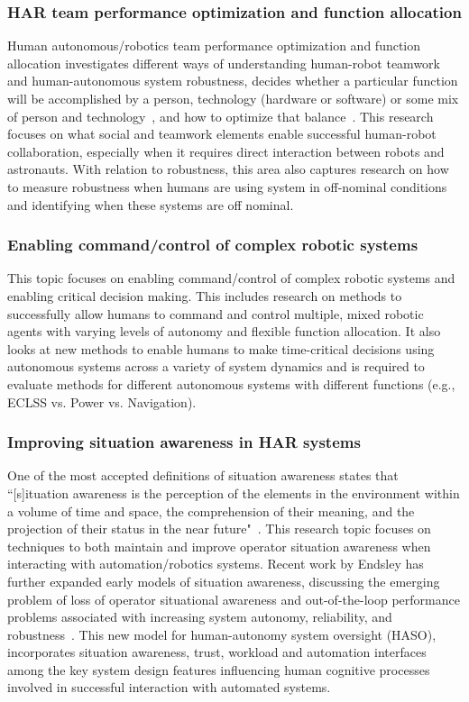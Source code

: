 \subsubsection{HAR team performance optimization and function allocation}
Human autonomous/robotics team performance optimization and function allocation investigates different ways of understanding human-robot teamwork and human-autonomous system robustness, decides whether a particular function will be accomplished by a person, technology (hardware or software) or some mix of person and technology~\citep{fitts_human_1951}, and how to optimize that balance~\citep{yanco_analysis_2015}.
This research focuses on what social and teamwork elements enable successful human-robot collaboration, especially when it requires direct interaction between robots and astronauts.
With relation to robustness, this area also captures research on how to measure robustness when humans are using system in off-nominal conditions and identifying when these systems are off nominal.

\subsubsection{Enabling command/control of complex robotic systems}
This topic focuses on enabling command/control of complex robotic systems and enabling critical decision making.
This includes research on methods to successfully allow humans to command and control multiple, mixed robotic agents with varying levels of autonomy and flexible function allocation.
It also looks at new methods to enable humans to make time-critical decisions using autonomous systems across a variety of system dynamics and is required to evaluate methods for different autonomous systems with different functions (e.g., ECLSS vs. Power vs. Navigation).

\subsubsection{Improving situation awareness in HAR systems}
One of the most accepted definitions of situation awareness states that ``[s]ituation awareness is the perception of the elements in the environment within a volume of time and space, the comprehension of their meaning, and the projection of their status in the near future"~\citep{endsley2017toward}.
This research topic focuses on techniques to both maintain and improve operator situation awareness when interacting with automation/robotics systems.
Recent work by Endsley has further expanded early models of situation awareness, discussing the emerging problem of loss of operator situational awareness and out-of-the-loop performance problems associated with increasing system autonomy, reliability, and robustness~\citep{endsley_here_2017}.
This new model for human-autonomy system oversight (HASO), incorporates situation awareness, trust, workload and automation interfaces among the key system design features influencing human cognitive processes involved in successful interaction with automated systems.

